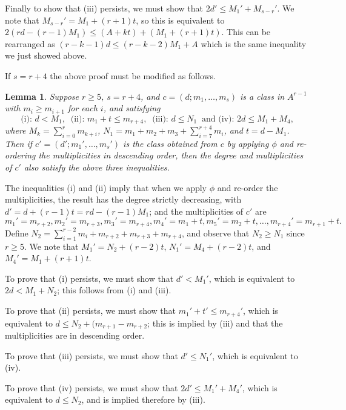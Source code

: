 \documentclass[12pt]{article}
\numberwithin{equation}{section}
\newtheorem{lemma}[equation]{Lemma}
\numberwithin{equation}{section}
\numberwithin{subeq}{equation}
\begin{document}
Finally to show that (iii) persists,
we must show that $2d' \leq M_1'+M_{s-r}'$.
We note that $M_{s-r}' = M_1+(r+1)t$, so this is equivalent to
$2(rd-(r-1)M_1) \leq (A+kt) + (M_1+(r+1)t)$.
This can be rearranged as
$(r-k-1)d \leq (r-k-2)M_1 + A$
which is the same inequality we just showed above.


If $s=r+4$ the above proof must be modified as follows.

\begin{lemma}
Suppose $r\geq 5$, $s = r+4$, and $c = (d;m_1,\ldots,m_s)$ is a class in $A^{r-1}$
with $m_i \geq m_{i+1}$ for each $i$, and satisfying
\[
\text{(i): }d < M_1, \;\; \text{(ii): }m_1+t \leq m_{r+4}, \;\;\text{(iii): } d \leq N_1 \;\;\text{and (iv): }
2d \leq M_1+M_4,
\]
where $M_k = \sum_{i=0}^{r} m_{k+i}$,
$N_1 = m_1+m_2+m_3+\sum_{i=7}^{r+4 }m_i$,
and $t=d-M_1$.
Then if $c'=(d';m_1',\ldots,m_s')$ is the class obtained from $c$ 
by applying $\phi$ and re-ordering the multiplicities in descending order,
then the degree and multiplicities of $c'$ also satisfy the above three inequalities.
\end{lemma}

\medskip{}
The inequalities (i) and (ii) imply that when we apply $\phi$ and re-order the multiplicities,
the result has the degree strictly decreasing,
with $d' = d+(r-1)t = rd-(r-1)M_1$;
and the multiplicities of $c'$ are
\[
m_1'=m_{r+2},m_2'=m_{r+3},m_{3}'=m_{r+4},m_{4}'=m_1+t, m_{5}'=m_2+t,\ldots,m_{r+4}'=m_{r+1}+t.
\]
Define $N_2 = \sum_{i=1}^{r-2} m_i + m_{r+2}+m_{r+3}+m_{r+4}$,
and observe that $N_2 \geq N_1$ since $r\geq 5$.
We note that
$M_1' = N_2+(r-2)t$,
$N_1' = M_4+(r-2)t$,
and $M_4' = M_1+(r+1)t$.

To prove that (i) persists, we must show that $d' < M_1'$,
which is equivalent to $2d < M_1+N_2$; this follows from (i) and (iii).

To prove that (ii) persists, we must show that $m_1'+t' \leq m_{r+4}'$,
which is equivalent to $d \leq N_2+(m_{r+1}-m_{r+2}$;
this is implied by (iii) and that the multiplicities are in descending order.

To prove that (iii) persists, we must show that $d'\leq N_1'$,
which is equivalent to (iv).

To prove that (iv) persists, we must show that $2d' \leq M_1'+M_4'$,
which is equivalent to $d \leq N_2$, and is implied therefore by (iii).

\end{document}

